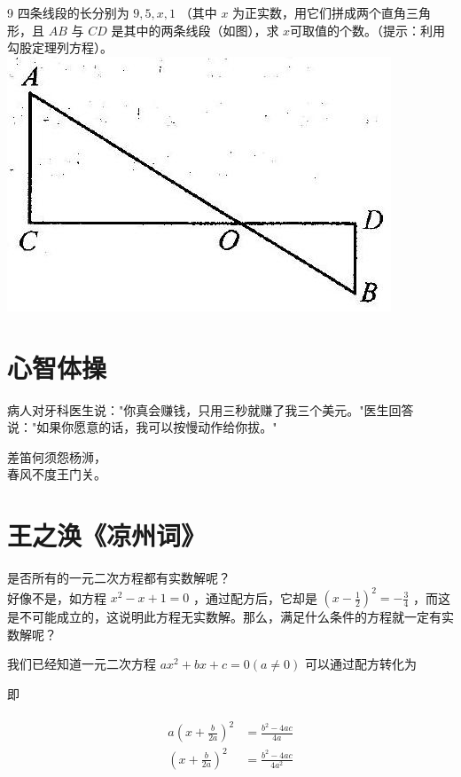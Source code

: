 \documentclass[10pt]{article}
\begin{document}
9 四条线段的长分别为 $9,5, x, 1$ （其中 $x$ 为正实数，用它们拼成两个直角三角形，且 $A B$ 与 $C D$ 是其中的两条线段（如图），求 $x$可取值的个数。（提示：利用勾股定理列方程）。\\
\includegraphics[max width=\textwidth, center]{2024_10_30_26b590fd1106d28139f0g-054}

\section*{心智体操}
病人对牙科医生说："你真会赚钱，只用三秒就赚了我三个美元。"医生回答说："如果你愿意的话，我可以按慢动作给你拔。"

差笛何须怨杨浉，\\
春风不度王门关。

\section*{王之涣《凉州词》}
是否所有的一元二次方程都有实数解呢？\\
好像不是，如方程 $x^{2}-x+1=0$ ，通过配方后，它却是 $\left(x-\frac{1}{2}\right)^{2}=-\frac{3}{4}$ ，而这是不可能成立的，这说明此方程无实数解。那么，满足什么条件的方程就一定有实数解呢？

我们已经知道一元二次方程 $a x^{2}+b x+c=0(a \neq 0)$ 可以通过配方转化为

即

\begin{align*}
\begin{aligned}
a\left(x+\frac{b}{2 a}\right)^{2} & =\frac{b^{2}-4 a c}{4 a} \\
\left(x+\frac{b}{2 a}\right)^{2} & =\frac{b^{2}-4 a c}{4 a^{2}}
\end{aligned}
\end{align*}
\end{document}
